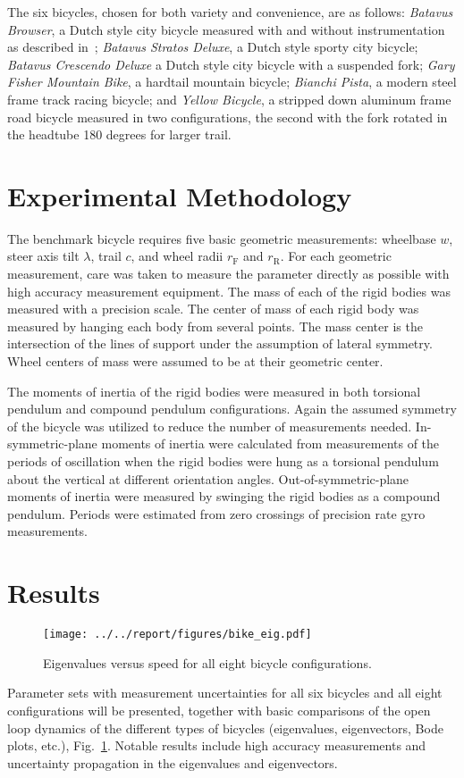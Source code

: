 \documentclass{bmd2010a}
\begin{document}
The six bicycles, chosen for both variety and convenience, are as follows:
\emph{Batavus Browser}, a Dutch style city bicycle measured with and without
instrumentation as described in~\cite{Kooijman2009a}; \emph{Batavus Stratos
Deluxe}, a Dutch style sporty city bicycle; \emph{Batavus Crescendo Deluxe} a
Dutch style city bicycle with a suspended fork; \emph{Gary Fisher Mountain
Bike}, a hardtail mountain bicycle; \emph{Bianchi Pista}, a modern steel frame
track racing bicycle; and \emph{Yellow Bicycle}, a stripped down aluminum frame
road bicycle measured in two configurations, the second with the fork rotated
in the headtube 180 degrees for larger trail.

\section*{Experimental Methodology}
The benchmark bicycle requires five basic geometric measurements: wheelbase
$w$, steer axis tilt $\lambda$, trail $c$, and wheel radii $r_\mathrm{F}$
and $r_\mathrm{R}$. For each geometric measurement, care was taken to measure
the parameter directly as possible with high accuracy measurement equipment.
The mass of each of the rigid bodies was
measured with a precision scale. The center of mass of each rigid
body was measured by hanging each body from several points. The mass
center is the intersection of the lines of support under the
assumption of lateral symmetry. Wheel centers of mass were assumed to be
at their geometric center.

The moments of inertia of the rigid bodies were measured in both torsional
pendulum and compound pendulum configurations. Again the assumed symmetry of the
bicycle was utilized to reduce the number of measurements needed.
In-symmetric-plane moments of inertia were calculated from measurements of the
periods of oscillation when the rigid bodies were hung as a torsional pendulum about the vertical at
different orientation angles. Out-of-symmetric-plane moments of inertia were
measured by swinging the rigid bodies as a compound pendulum. Periods were
estimated from zero crossings of precision rate gyro measurements.
\section*{Results}
\begin{figure}[htbp]
    \begin{center}
        \texttt{[image: ../../report/figures/bike\_eig.pdf]}
    \end{center}
    \caption{Eigenvalues versus speed for all eight bicycle configurations.}
    \label{fig:bike_eig}
\end{figure}

Parameter sets with measurement uncertainties for all six bicycles and all
eight configurations  will be presented, together with basic comparisons of the
open loop dynamics of the different types of bicycles (eigenvalues,
eigenvectors, Bode plots, etc.), Fig.~\ref{fig:bike_eig}. Notable results
include high accuracy measurements and uncertainty propagation in the eigenvalues and eigenvectors.



\end{document}
